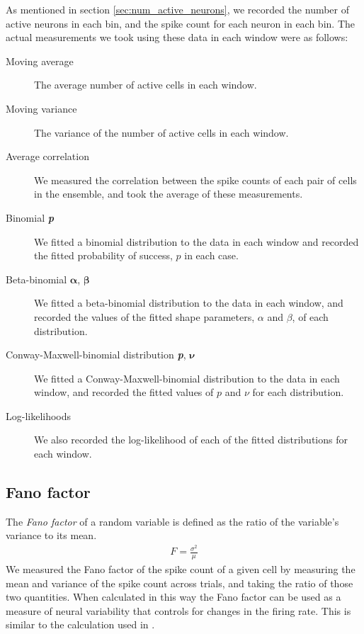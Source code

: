     As mentioned in section \ref{sec:num_active_neurons}, we recorded the number of active neurons in each bin, and the spike count for each neuron in each bin. The actual measurements we took using these data in each window were as follows:
    \begin{description}
      \item[Moving average] The average number of active cells in each window.
      \item[Moving variance] The variance of the number of active cells in each window.
      \item[Average correlation] We measured the correlation between the spike counts of each pair of cells in the ensemble, and took the average of these measurements.
      \item[Binomial \textit{\textbf{p}}] We fitted a binomial distribution to the data in each window and recorded the fitted probability of success, $p$ in each case.
      \item[Beta-binomial $\boldsymbol{\alpha}$, $\boldsymbol{\beta}$] We fitted a beta-binomial distribution to the data in each window, and recorded the values of the fitted shape parameters, $\alpha$ and $\beta$, of each distribution.
      \item[Conway-Maxwell-binomial distribution \textit{\textbf{p}}, $\boldsymbol{\nu}$] We fitted a Conway-Maxwell-binomial distribution to the data in each window, and recorded the fitted values of $p$ and $\nu$ for each distribution.
      \item[Log-likelihoods] We also recorded the log-likelihood of each of the fitted distributions for each window.
    \end{description}

    \subsection{Fano factor}\label{sec:fano_factor}
    The \textit{Fano factor} of a random variable is defined as the ratio of the variable's variance to its mean.
    \begin{align}\label{eq:fano_factor}
      F = \frac{\sigma^2}{\mu}
    \end{align}
    We measured the Fano factor of the spike count of a given cell by measuring the mean and variance of the spike count across trials, and taking the ratio of those two quantities. When calculated in this way the Fano factor can be used as a measure of neural variability that controls for changes in the firing rate.  This is similar to the calculation used in  \parencite{churchland}.

